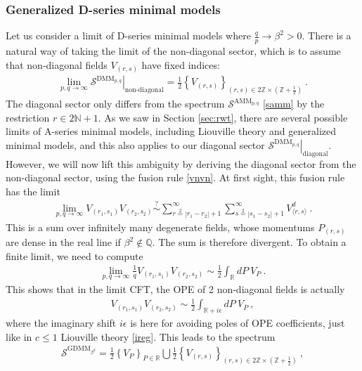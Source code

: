 \documentclass[12pt, a4paper]{article}
\begin{document}
\subsubsection{Generalized D-series minimal models}\label{sec:gdmm}

Let us consider a limit of D-series minimal models where $\frac{q}{p}\to \beta^2>0$. There is a natural way of taking the limit of the non-diagonal sector, which is to assume that non-diagonal fields $V_{(r,s)}$ have fixed indices:
\begin{align}
 \lim_{p,q\to\infty} \left. \mathcal{S}^{\text{DMM}_{p,q}} \right|_{\text{non-diagonal}} = 
 \frac12\left\{V_{(r,s)} \right\}_{ (r,s)\in 2\mathbb{Z}\times (\mathbb{Z}+\frac12)}\ .
\end{align}
The diagonal sector only differs from the spectrum $\mathcal{S}^{\text{AMM}_{p,q}}$ \eqref{samm} by the restriction $r\in 2\mathbb{N}+1$. 
As we saw in Section \ref{sec:rwt}, there are several possible limits of A-series minimal models, including Liouville theory and generalized minimal models, and this also applies to our diagonal sector $\left. \mathcal{S}^{\text{DMM}_{p,q}} \right|_{\text{diagonal}} $. However, we will now lift this ambiguity by deriving the diagonal sector from the non-diagonal sector, using the fusion rule \eqref{vnvn}. At first sight, this fusion rule has the limit  
\begin{align}
 \lim_{p,q\to\infty} V_{(r_1,s_1)} V_{(r_2,s_2)}  \overset{?}{\sim} \sum_{r\overset{2}{=}|r_1-r_2|+1}^{\infty} \sum_{s\overset{2}{=}|s_1-s_2|+1}^{\infty} V^d_{\langle r,s\rangle}\ .
\end{align}
This is a sum over infinitely many degenerate fields, whose momentums $P_{(r,s)}$ are dense in the real line if $\beta^2\notin \mathbb{Q}$. The sum is therefore divergent. To obtain a finite limit, we need to compute 
\begin{align}
 \lim_{p,q\to\infty} \frac{1}{q} V_{(r_1,s_1)} V_{(r_2,s_2)} \sim \frac12 \int_\mathbb{R} dP \ V_P\ .
\end{align}
This shows that in the limit CFT, the OPE of 2 non-diagonal fields is actually 
\begin{align}
 V_{(r_1,s_1)}V_{(r_2,s_2)} \sim \frac12 \int_{\mathbb{R}+i\epsilon} dP\ V_P\ ,
 \label{vrsvrs}
\end{align}
where the imaginary shift $i\epsilon$ is here for avoiding poles of OPE coefficients, just like in $c\leq 1$ Liouville theory \eqref{ireg}. This leads to the spectrum
\begin{align}
\boxed{\mathcal{S}^{\text{GDMM}_{\beta^2}} = \frac12 \left\{V_P\right\}_{P\in \mathbb{R}} \bigcup  \frac12\left\{V_{(r,s)} \right\}_{ (r,s)\in 2\mathbb{Z}\times (\mathbb{Z}+\frac12)}  }\ ,
\end{align}
\end{document}
